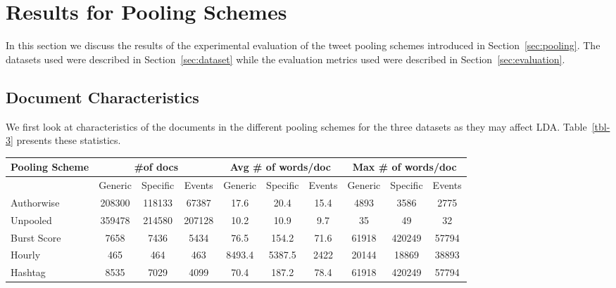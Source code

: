 \documentclass{sig-alternate}
\newcommand{\secmoveup}{\vspace{-1.mm}}
\begin{document}
\secmoveup
\section{Results for Pooling Schemes}

In this section we discuss the results of the experimental evaluation
of the tweet pooling schemes introduced in
Section~\ref{sec:pooling}. The datasets used were described in
Section~\ref{sec:dataset} while the evaluation metrics used were
described in Section~\ref{sec:evaluation}.

\label{sec:init_results}

\secmoveup
\subsection{Document Characteristics}

We first look at characteristics of the documents
in the different pooling schemes for the three datasets as they may
affect LDA.  Table~\ref{tbl-3} presents these statistics.

{
\begin{table*}%
\centering
\caption{Document Characteristics for different pooling schemes.}\label{tbl-3}
\resizebox{14cm}{!} 
{
	\begin{tabular}{|l|ccc|ccc|ccc|}
	\hline
	Pooling Scheme  & \multicolumn {3}{c|}{\#of docs} & \multicolumn {3}{c|}{Avg \# of words/doc} & \multicolumn {3}{c|}{Max \# of words/doc}\\
	\hline
	 & Generic & Specific & Events &  Generic & Specific & Events &  Generic & Specific & Events\\
	\hline
	Authorwise & 208300 & 118133 & 67387 & 17.6 & 20.4 & 15.4 & 4893 & 3586 & 2775 \\
	\hline
	Unpooled & 359478 & 214580 & 207128 & 10.2 & 10.9 & 9.7 & 35 & 49 & 32 \\
	\hline
	Burst Score & 7658 & 7436 & 5434 & 76.5 & 154.2 & 71.6 & 61918 & 420249 & 57794 \\
	\hline
	Hourly & 465 & 464 & 463 & 8493.4 & 5387.5 & 2422 & 20144 & 18869 & 38893 \\
	\hline
	Hashtag & 8535 & 7029 & 4099 & 70.4 & 187.2 & 78.4 & 61918 & 420249 & 57794 \\
	\hline
	\end{tabular}
}\vspace*{-6pt}
\end{table*}
}
\end{document}
